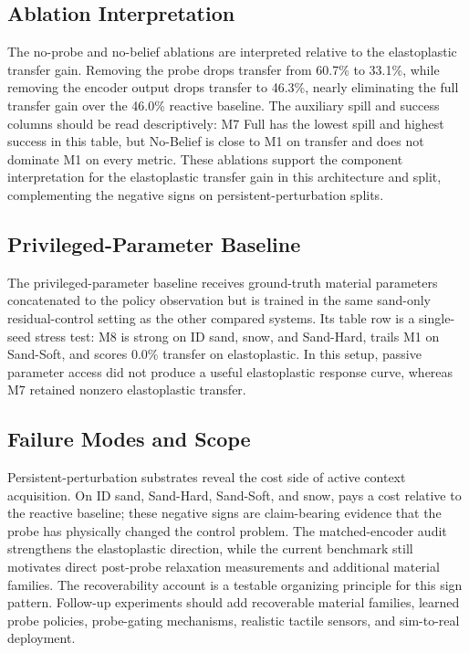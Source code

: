 \subsection{Ablation Interpretation}
The no-probe and no-belief ablations are interpreted relative to the elastoplastic transfer gain. Removing the probe drops transfer from 60.7\% to 33.1\%, while removing the encoder output drops transfer to 46.3\%, nearly eliminating the full \PTA{} transfer gain over the 46.0\% reactive baseline. The auxiliary spill and success columns should be read descriptively: M7 Full has the lowest spill and highest success in this table, but No-Belief is close to M1 on transfer and does not dominate M1 on every metric. These ablations support the component interpretation for the elastoplastic transfer gain in this architecture and split, complementing the negative signs on persistent-perturbation splits.

\subsection{Privileged-Parameter Baseline}
The privileged-parameter baseline receives ground-truth material parameters concatenated to the policy observation but is trained in the same sand-only residual-control setting as the other compared systems. Its table row is a single-seed stress test: M8 is strong on ID sand, snow, and Sand-Hard, trails M1 on Sand-Soft, and scores 0.0\% transfer on elastoplastic. In this setup, passive parameter access did not produce a useful elastoplastic response curve, whereas M7 retained nonzero elastoplastic transfer.

\subsection{Failure Modes and Scope}
Persistent-perturbation substrates reveal the cost side of active context acquisition. On ID sand, Sand-Hard, Sand-Soft, and snow, \PTA{} pays a cost relative to the reactive baseline; these negative signs are claim-bearing evidence that the probe has physically changed the control problem. The matched-encoder audit strengthens the elastoplastic direction, while the current benchmark still motivates direct post-probe relaxation measurements and additional material families. The recoverability account is a testable organizing principle for this sign pattern. Follow-up experiments should add recoverable material families, learned probe policies, probe-gating mechanisms, realistic tactile sensors, and sim-to-real deployment.

